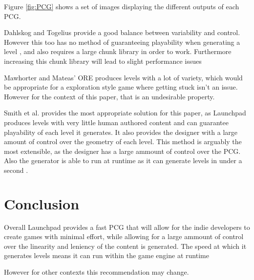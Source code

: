 \documentclass{scrartcl}
\begin{document}
Figure \ref{fig:PCG} shows a set of images displaying the different outputs of each PCG.

Dahlskog and Togelius provide a good balance between variability and control. However this too has no method of guaranteeing playability when generating a level \cite[p.4]{dahlskog2014}, and also requires a large chunk library in order to work. Furthermore increasing this chunk library will lead to slight performance issues

Mawhorter and Mateas' ORE produces levels with a lot of variety, which would be appropriate for a exploration style game where getting stuck isn't an issue. However for the context of this paper, that is an undesirable property.

Smith et al. provides the most appropriate solution for this paper, as Launchpad produces levels with very little human authored content and can guarantee playability of each level it generates. It also provides the designer with a large amount of control over the geometry of each level. This method is arguably the most extensible, as the designer has a large ammount of control over the PCG. Also the generator is able to run at runtime as it can generate levels in under a second \cite[p.8]{smith2012web}.




\section{Conclusion}

Overall Launchpad provides a fast PCG that will allow for the indie developers to create games with minimal effort, while allowing for a large ammount of control over the linearity and leniency of the content is generated. The speed at which it generates levels means it can run within the game engine at runtime 


However for other contexts this recommendation may change.






\end{document}
